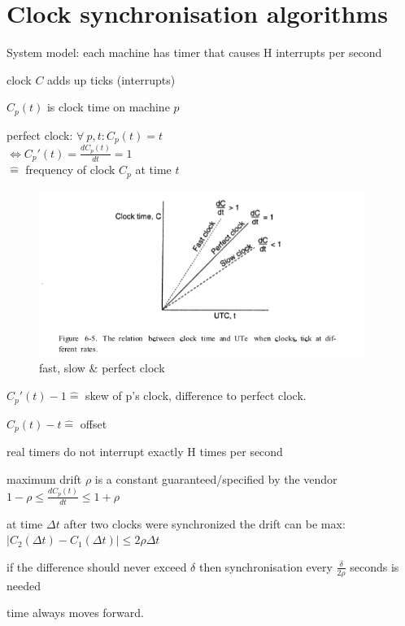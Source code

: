 \documentclass[ngerman,a4paper]{report}
\begin{document}
\section{Clock synchronisation algorithms}
System model: each machine has timer that causes H interrupts per second
\begin{compactitem}
	\item clock $C$ adds up ticks (interrupts)
	\item $C_p(t)$ is clock time on machine $p$
	\item perfect clock: $\forall \  p, t : C_p(t) = t $ \\
	$\Longleftrightarrow C_p'(t) = \frac{d C_p(t)}{dt} = 1$\\
	$\mathrel{\widehat{=}}$ frequency of clock $C_p$ at time $t$

\begin{figure}[h]
	\centering
	\includegraphics[width=400px]{gfx/clock-drift.png}
	\caption{fast, slow \& perfect clock}
	\label{img:clock-drift}
\end{figure}

	\item $C_p'(t) - 1 \mathrel{\widehat{=}}$ skew of p's clock, difference to perfect clock.
	\item $C_p(t)-t \mathrel{\widehat{=}}$ offset
	\item real timers do not interrupt exactly H times per second
	\item maximum drift $\rho$ is a constant guaranteed/specified by the vendor \\
	$1-\rho \leq \frac{d C_p(t)}{dt} \leq 1 + \rho$

	\item at time $\Delta t$ after two clocks were synchronized the drift can be max: \\
	$|C_2(\Delta t) - C_1(\Delta t) | \leq 2 \rho \Delta t$
	\item if the difference should never exceed $\delta$ then synchronisation every $\frac {\delta}{2 \rho}$ seconds is needed
	\item time always moves forward.
\end{compactitem}
\end{document}
